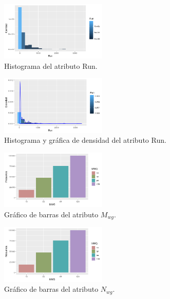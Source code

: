 \documentclass[osajnl,twocolumn,showpacs,superscriptaddress,10pt]{revtex4-1} %
\begin{document}
\twocolumngrid

\begin{figure}[H]
    \centering
    \includegraphics[width=0.45\textwidth]{plots/run_hist}
    \caption{Histograma del atributo Run.}
    \label{figure:run_hist}
\end{figure}

\begin{figure}[H]
    \centering
    \includegraphics[width=0.45\textwidth]{plots/run_density}
    \caption{Histograma y gráfica de densidad del atributo Run.}
    \label{figure:run_density}
\end{figure}

\begin{figure}[H]
    \centering
    \includegraphics[width=0.45\textwidth]{plots/mwg_bar}
    \caption{Gráfico de barras del atributo $M_{wg}$.}
    \label{figure:mwg_bar}
\end{figure}

\begin{figure}[H]
    \centering
    \includegraphics[width=0.45\textwidth]{plots/nwg_bar}
    \caption{Gráfico de barras del atributo $N_{wg}$.}
    \label{figure:nwg_bar}
\end{figure}
\end{document}
